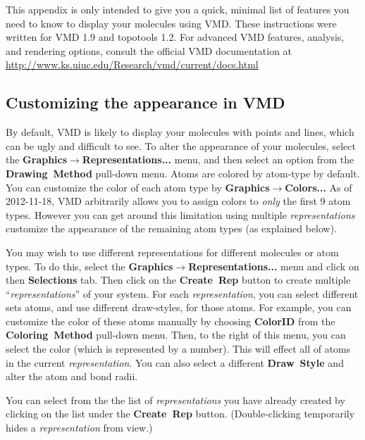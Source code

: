 \documentclass[11pt]{article}
\begin{document}
This appendix is only intended to give you a quick, 
minimal list of features you need to know to 
display your molecules using VMD. 
These instructions were written for VMD 1.9 
and topotools 1.2.
For advanced VMD features, analysis, and rendering options,
consult the official VMD documentation at
\url{http://www.ks.uiuc.edu/Research/vmd/current/docs.html}

\subsection{Customizing the appearance in VMD}
\label{sec:vmd_representation}
By default, VMD is likely to display your molecules with 
points and lines, which can be ugly and difficult to see.
To alter the appearance of your molecules, select the 
\textbf{Graphics}$\rightarrow$\textbf{Representations...} menu, 
and then select an option from the 
\mbox{\textbf{Drawing Method}} pull-down menu.
Atoms are colored by atom-type by default.
You can customize the color of each atom type by 
\mbox{\textbf{Graphics}}$\rightarrow$\mbox{\textbf{Colors...}}
As of 2012-11-18, VMD arbitrarily allows you to
assign colors to \textit{only} the first 9 atom types.
However you can get around this limitation
using multiple \textit{representations} 
customize the appearance of the 
remaining atom types (as explained below).

You may wish to use different representations for different molecules 
or atom types.  To do this, select the
\textbf{Graphics}$\rightarrow$\textbf{Representations...} menu
and click on then \mbox{\textbf{Selections}} tab.
Then click on the \mbox{\textbf{Create Rep}} 
button to create multiple ``\textit{representations}'' of your system.
For each \textit{representation}, you can select different sets atoms, 
and use different draw-styles, for those atoms.
For example, you can customize the color of these atoms manually 
by choosing \textbf{ColorID} from the 
\mbox{\textbf{Coloring Method}} pull-down menu.
Then, to the right of this menu, you can select the color 
(which is represented by a number).
This will effect all of atoms in the current \textit{representation}.
You can also select a different \mbox{\textbf{Draw Style}} and
alter the atom and bond radii.

You can select from the the list of \textit{representations} you have 
already created
by clicking on the list under the \mbox{\textbf{Create Rep}} button.
(Double-clicking temporarily hides a \textit{representation} from view.)
\end{document}
